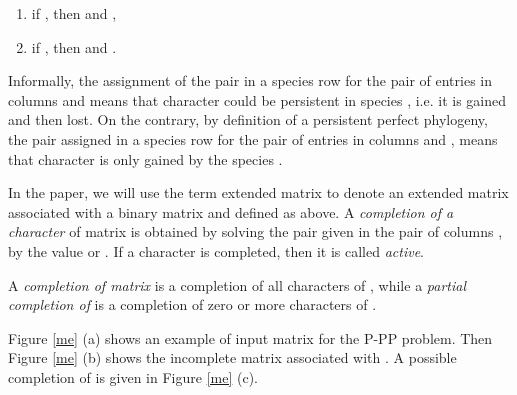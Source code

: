 \documentclass{llncs}
\newcommand{\me}{{} }
\newcommand{\mec}{{}, }
\newcommand{\med}{{}. }
\begin{document}
\begin{enumerate}
 

\item    if , then   and ,

\item    if , then   and .
\end{enumerate}






Informally, the assignment of the pair  in a species row  for the pair of   entries in columns  and  means that character  could be persistent in species , i.e. it is gained and then lost. On the contrary, by definition of a persistent perfect phylogeny,  the pair  assigned in  a species  row  for the pair of   entries in columns  and , means that character  is only gained by the species .

In the paper, we will use  the term extended matrix to denote an extended matrix associated with a binary matrix and defined as above. 
A {\em completion  of  a character }   of matrix \me  is
 obtained by solving the pair  given in  the pair of columns   , 
     by the   value  or
.   If a character   is completed,  then it is  called {\em active}. 


A  {\em completion  of matrix}   \me is a completion
of all characters of \mec while a {\em partial completion  of} \me
is a completion of zero  or more  characters of \med


Figure \ref{me} (a) shows an example of  input  matrix  for the P-PP problem. Then Figure \ref{me} (b) shows the incomplete  matrix \me associated with . A possible completion of \me is given in  Figure \ref{me} (c). 
\end{document}
